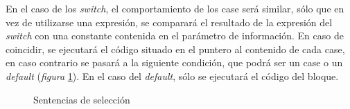 \documentclass[a4paper,10pt]{article}
\begin{document}
En el caso de los \textit{switch}, el comportamiento de los case será similar, sólo que en vez de utilizarse una expresión, se comparará el resultado de la expresión del \textit{switch} con una constante contenida en el parámetro de información. En caso de coincidir, se ejecutará el código situado en el puntero al contenido de cada case, en caso contrario se pasará a la siguiente condición, que podrá ser un case o un \textit{default} (\emph{figura} \ref{fig:sel3}). En el caso del \textit{default}, sólo se ejecutará el código del bloque.
\begin{figure}[H]
  \centering
  \hspace{11mm}
  \caption{Sentencias de selección}
  \label{fig:sel3}
\end{figure}
\end{document}
